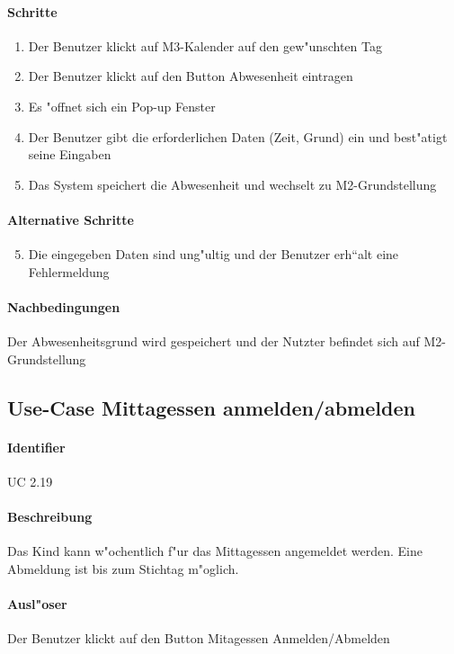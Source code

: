   \paragraph{Schritte}
  \begin{enumerate}
   \item Der Benutzer klickt auf M3-Kalender auf den gew"unschten Tag
   \item Der Benutzer klickt auf den Button \dq Abwesenheit eintragen\dq
   \item Es "offnet sich ein Pop-up Fenster
   \item Der Benutzer gibt die erforderlichen Daten (Zeit, Grund) ein und best"atigt seine Eingaben
   \item Das System speichert die Abwesenheit und wechselt zu M2-Grundstellung
  \end{enumerate}

  \paragraph{Alternative Schritte}
  \begin{enumerate}
  \setcounter{enumi}{4}
   \item Die eingegeben Daten sind ung"ultig und der Benutzer erh``alt eine Fehlermeldung
  \end{enumerate}

  \paragraph{Nachbedingungen}
  Der Abwesenheitsgrund wird gespeichert und der Nutzter befindet sich auf M2-Grundstellung

  
  \newpage
 \subsection{Use-Case Mittagessen anmelden/abmelden}
  \paragraph{Identifier}
  UC 2.19
  \paragraph{Beschreibung}
  Das Kind kann w"ochentlich f"ur das Mittagessen angemeldet werden. Eine Abmeldung ist bis zum Stichtag m"oglich.
  \paragraph{Ausl"oser}
  Der Benutzer klickt auf den Button Mitagessen Anmelden/Abmelden
